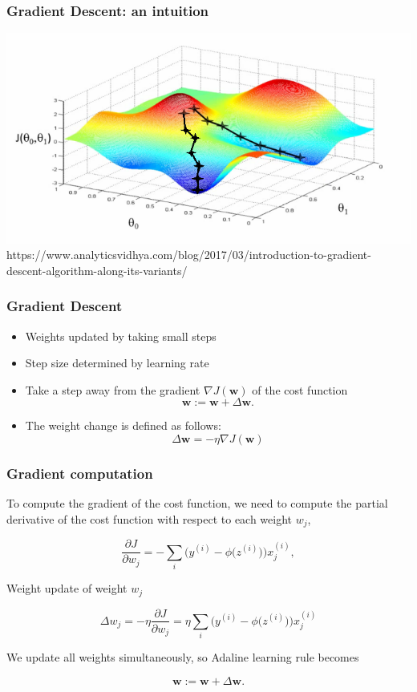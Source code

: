 \documentclass{beamer}
\begin{document}
\begin{frame}
  \frametitle{Gradient Descent: an intuition}
  \center
  \includegraphics[scale=0.8]{Images/grad_desc2.png}
  \vspace{0.2in}
  \tiny
  https://www.analyticsvidhya.com/blog/2017/03/introduction-to-gradient-descent-algorithm-along-its-variants/
\end{frame}

\begin{frame}
  \frametitle{Gradient Descent}
  \begin{itemize}
  \item Weights updated by taking small steps
  \item Step size determined by learning rate
  \item Take a step away from the gradient $\nabla J(\mathbf{w})$ of the cost function
    \[
    \mathbf{w} := \mathbf{w} + \Delta \mathbf{w}.
    \]
  \item The weight change is defined as follows:
    \[
    \Delta \mathbf{w} = - \eta \nabla J(\mathbf{w})
    \]
  \end{itemize}
\end{frame}

\begin{frame}
  \frametitle{Gradient computation}
  To compute the gradient of the cost function, we need to compute the partial derivative of the cost function with respect to each weight $w_j$,

  \[
  \frac{\partial J}{\partial w_j} = - \sum_i \bigg( y^{(i)} - \phi \big(z^{(i)} \big) \bigg) x_{j}^{(i)},
  \]

  Weight update of weight $w_j$

  \[
  \Delta w_j = - \eta \frac{\partial J}{\partial w_j} = \eta  \sum_i \bigg( y^{(i)} - \phi \big(z^{(i)} \big) \bigg) x_{j}^{(i)}
  \]

  We update all weights simultaneously, so Adaline learning rule becomes

  \[
  \mathbf{w} := \mathbf{w} + \Delta \mathbf{w}.
  \]
\end{frame}
\end{document}
